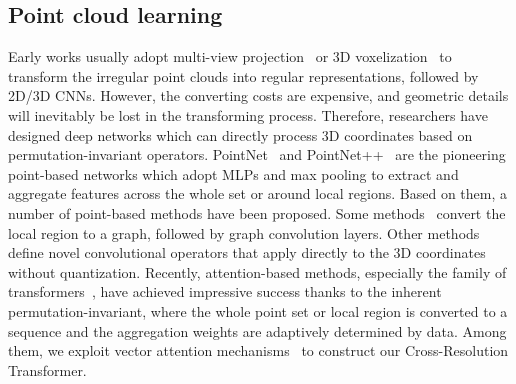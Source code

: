 \documentclass[letterpaper]{article} %
\begin{document}
\subsection{Point cloud learning}
Early works usually adopt multi-view projection~\cite{li2016vehicle,chen2017multi,lang2019pointpillars}
or 3D voxelization~\cite{maturana2015voxnet,song2017semantic,riegler2017octnet,choy20194d} to transform the irregular point clouds into regular representations, followed by 2D/3D CNNs.
However, the converting costs are expensive, and geometric details will inevitably be lost in the transforming process.
Therefore, researchers have designed deep networks which can directly process 3D coordinates based on permutation-invariant operators.
PointNet~\cite{qi2017pointnet} and PointNet++~\cite{qi2017pointnet++} are the pioneering point-based networks which adopt MLPs and max pooling to extract and aggregate features across the whole set or around local regions.
Based on them, a number of point-based methods have been proposed.
Some methods~\cite{wang2019dynamic, zhao2019pointweb,simonovsky2017dynamic} convert the local region to a graph, followed by graph convolution layers.
Other methods~\cite{xu2018spidercnn, wu2019pointconv,thomas2019kpconv} define novel convolutional operators that apply directly to the 3D coordinates without quantization.
Recently, attention-based methods, especially the family of transformers~\cite{vaswani2017attention, zhao2021point, guo2021pct,park2022fast}, have achieved impressive success thanks to the inherent permutation-invariant, where the whole point set or local region is converted to a sequence and the aggregation weights are adaptively
determined by data.
Among them, we exploit vector attention mechanisms~\cite{zhao2021point} to construct our Cross-Resolution Transformer.
\end{document}
